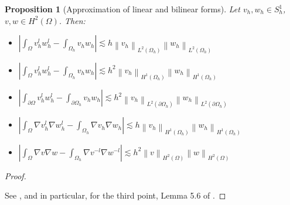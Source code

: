 \documentclass[english,a4paper,10pt,oneside]{scrbook}	%
\theoremstyle{break}
\newtheorem{prop}[equation]{Proposition}
\newenvironment{mproof}[1][\proofname]{%
  \begin{proof}[#1]$ $\par\nobreak\ignorespaces
}{%
  \end{proof}
}
\renewcommand*{\proofname}{Proof}
\theoremstyle{remark}
\newcommand{\ds}{\displaystyle}
\newcommand{\norm}[1]{\left\lVert#1\right\rVert}
\begin{document}
\begin{prop}[Approximation of linear and bilinear forms]
\label{prop:lin_appr}
Let $v_h, w_h \in S^1_h$, $v,w \in H^2(\Omega)$. Then:

\begin{itemize}
	\item $\ds \left | \int_\Omega v_h^lw_h^l - \int_{\Omega_h}v_hw_h\right |\lesssim h \norm{v_h}_{L^2(\Omega_h)}\norm{w_h}_{L^2(\Omega_h)}$
	\item $\ds \left | \int_\Omega v_h^lw_h^l - \int_{\Omega_h}v_hw_h\right |\lesssim h^2 \norm{v_h}_{H^1(\Omega_h)}\norm{w_h}_{H^1(\Omega_h)}$
	\item $\ds \left | \int_{\partial \Omega} v_h^lw_h^l - \int_{\partial \Omega_h}v_hw_h\right |\lesssim h^2 \norm{v_h}_{L^2(\partial \Omega_h)}\norm{w_h}_{L^2(\partial \Omega_h)}$
	\item $\ds \left | \int_\Omega \nabla v_h^l\nabla w_h^l - \int_{\Omega_h}\nabla v_h\nabla w_h\right |\lesssim h \norm{v_h}_{H^1(\Omega_h)}\norm{w_h}_{H^1(\Omega_h)}$
	\item $\ds \left | \int_\Omega \nabla v\nabla w - \int_{\Omega_h}\nabla v^{-l}\nabla w^{-l}\right |\lesssim h^2 \norm{v}_{H^2(\Omega)}\norm{w}_{H^2(\Omega)}$

\end{itemize}
\end{prop}

\begin{mproof}
See \cite{edelmann}, and in particular, for the third point, Lemma 5.6 of \cite{kovacs}.
\end{mproof}
\end{document}
